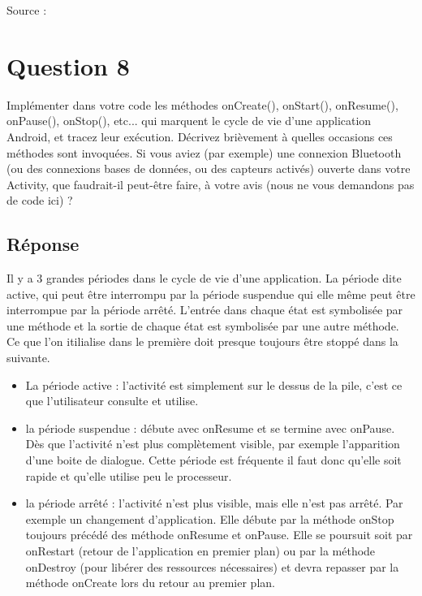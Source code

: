 \documentclass[francais,12pt]{article}
\begin{document}
		Source :
		
	\section*{Question 8}
		Implémenter dans votre code les méthodes onCreate(), onStart(), onResume(), onPause(), onStop(), etc... qui marquent le cycle de vie d'une application Android, et tracez leur exécution. Décrivez brièvement à quelles occasions ces méthodes sont invoquées. Si vous aviez (par exemple) une connexion Bluetooth (ou des connexions bases de données, ou des capteurs activés) ouverte dans votre Activity, que faudrait-il peut-être faire, à votre avis (nous ne vous demandons pas de code ici) ? 
		
		\subsection*{Réponse}
		Il y a 3 grandes périodes dans le cycle de vie d'une application. La période dite active, qui peut être interrompu par la période
		suspendue qui elle même peut être interrompue par la période arrêté.
		L'entrée dans chaque état est symbolisée par une méthode et la sortie de chaque état est symbolisée par une autre méthode. Ce que l'on itilialise dans le première doit presque toujours être stoppé dans la suivante.
		
		\begin{itemize}
			\item La période active : l'activité est simplement sur le dessus de la pile, c'est ce que l'utilisateur consulte et utilise. 
			\item la période suspendue : débute avec onResume et se termine avec onPause. Dès que l'activité n'est plus complètement visible, par exemple l'apparition d'une boite de dialogue. Cette période est fréquente il faut donc qu'elle soit rapide et qu'elle utilise peu le processeur.
			\item la période arrêté : l'activité n'est plus visible, mais elle n'est pas arrêté. Par exemple un changement d'application. Elle débute par la méthode onStop toujours précédé des méthode onResume et onPause. Elle se poursuit soit par onRestart (retour de l'application en premier plan) ou par la méthode onDestroy (pour libérer des ressources nécessaires) et devra repasser par la méthode onCreate lors du retour au premier plan.
		\end{itemize}
		
\end{document}
